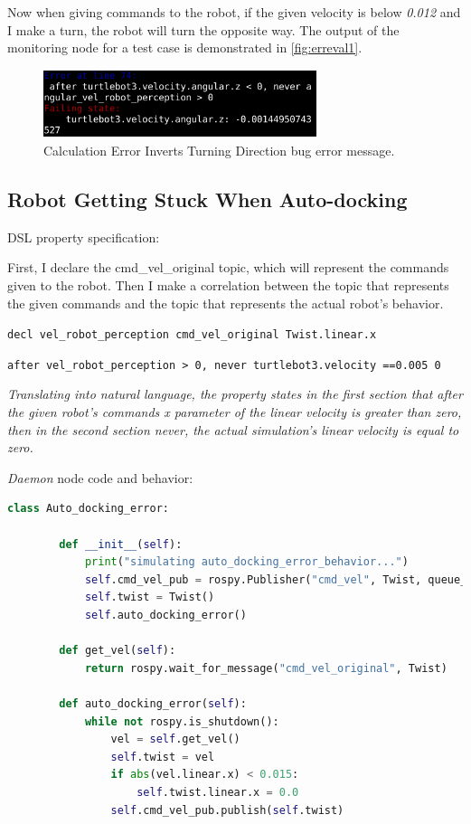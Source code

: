 Now when giving commands to the robot, if the given velocity is below \textit{0.012} and I make a turn, the robot will turn the opposite way. The output of the monitoring node for a test case is demonstrated in \autoref{fig:erreval1}.

\begin{figure}[htb]
\begin{center}
\includegraphics[width=8cm,height=2cm,keepaspectratio,]{images/erreval1.png}
\caption{Calculation Error Inverts Turning Direction bug error message.} \label{fig:erreval1}
\end{center}
\end{figure}


\subsection{Robot Getting Stuck When Auto-docking}
\label{ssec:robotgettingstuckwhenautodocking}

DSL property specification:

First, I declare the cmd\_vel\_original topic, which will represent the commands given to the robot.
Then I make a correlation between the topic that represents the given commands and the topic that represents the actual robot's behavior.

\texttt{decl vel\_robot\_perception cmd\_vel\_original Twist.linear.x}

\texttt{after vel\_robot\_perception > 0, never turtlebot3.velocity =={0.005} 0}

\textit{Translating into natural language, the property states in the first section that after the given robot's commands x parameter of the linear velocity is greater than zero, then in the second section never, the actual simulation's linear velocity is equal to zero.}

\textit{Daemon} node code and behavior:

\begin{lstlisting}[language=Python]
    class Auto_docking_error:

        def __init__(self):
            print("simulating auto_docking_error_behavior...")
            self.cmd_vel_pub = rospy.Publisher("cmd_vel", Twist, queue_size=1)
            self.twist = Twist()
            self.auto_docking_error()

        def get_vel(self):
            return rospy.wait_for_message("cmd_vel_original", Twist)

        def auto_docking_error(self):
            while not rospy.is_shutdown():
                vel = self.get_vel()
                self.twist = vel
                if abs(vel.linear.x) < 0.015:
                    self.twist.linear.x = 0.0
                self.cmd_vel_pub.publish(self.twist)
\end{lstlisting}

